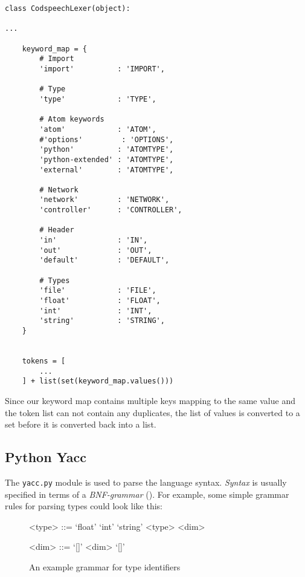 \begin{lstlisting}
class CodspeechLexer(object):

...

    keyword_map = {
        # Import
        'import'          : 'IMPORT',

        # Type
        'type'            : 'TYPE',

        # Atom keywords
        'atom'            : 'ATOM',
        #'options'         : 'OPTIONS',
        'python'          : 'ATOMTYPE',
        'python-extended' : 'ATOMTYPE',
        'external'        : 'ATOMTYPE',

        # Network
        'network'         : 'NETWORK',
        'controller'      : 'CONTROLLER',
                
        # Header
        'in'              : 'IN',
        'out'             : 'OUT',
        'default'         : 'DEFAULT',
        
        # Types
        'file'            : 'FILE',
        'float'           : 'FLOAT',
        'int'             : 'INT',
        'string'          : 'STRING',
    }


    tokens = [
        ...
    ] + list(set(keyword_map.values()))
\end{lstlisting}

\noindent Since our keyword map contains multiple keys mapping to the
same value and the token list can not contain any duplicates, the list
of values is converted to a set before it is converted back into a
list.


\subsection{Python Yacc}
The \texttt{yacc.py} module is used to parse the language
syntax. \emph{Syntax} is usually specified in terms of a
\emph{BNF-grammar} (). For example, some
simple grammar rules for parsing types could look like this:

\begin{figure}[h!]
  \begin{grammar}
    <type> ::= `float'
    \alt `int'
    \alt `string'
    \alt <type> <dim>

    <dim> ::= `[]'
    \alt <dim> `[]'
  \end{grammar}
  \caption{An example grammar for type identifiers}
  \label{grammar:typeex}
\end{figure}

